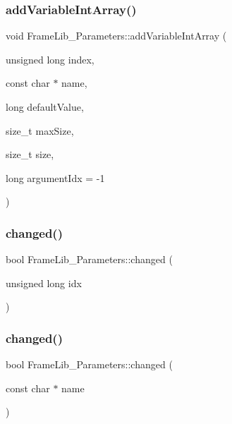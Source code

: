 \subsubsection{\texorpdfstring{add\+Variable\+Int\+Array()}{addVariableIntArray()}}
{\footnotesize\ttfamily void Frame\+Lib\+\_\+\+Parameters\+::add\+Variable\+Int\+Array (\begin{DoxyParamCaption}\item[{unsigned long}]{index,  }\item[{const char $\ast$}]{name,  }\item[{long}]{default\+Value,  }\item[{size\+\_\+t}]{max\+Size,  }\item[{size\+\_\+t}]{size,  }\item[{long}]{argument\+Idx = {\ttfamily -\/1} }\end{DoxyParamCaption})\hspace{0.3cm}{\ttfamily [inline]}}

\mbox{\label{class_frame_lib___parameters_a1ddc66de3c5b22c98c61692139d6edb1}} 
\subsubsection{\texorpdfstring{changed()}{changed()}\hspace{0.1cm}{\footnotesize\ttfamily [1/2]}}
{\footnotesize\ttfamily bool Frame\+Lib\+\_\+\+Parameters\+::changed (\begin{DoxyParamCaption}\item[{unsigned long}]{idx }\end{DoxyParamCaption})\hspace{0.3cm}{\ttfamily [inline]}}

\mbox{\label{class_frame_lib___parameters_a6bd6af480a8d8f589ee7443c690f75b0}} 
\subsubsection{\texorpdfstring{changed()}{changed()}\hspace{0.1cm}{\footnotesize\ttfamily [2/2]}}
{\footnotesize\ttfamily bool Frame\+Lib\+\_\+\+Parameters\+::changed (\begin{DoxyParamCaption}\item[{const char $\ast$}]{name }\end{DoxyParamCaption})\hspace{0.3cm}{\ttfamily [inline]}}

